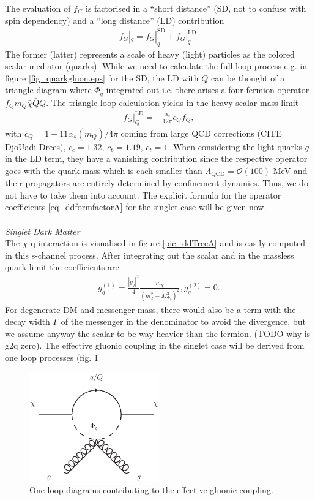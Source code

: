 \noindent The evaluation of $f_G$ is factorised in a ``short distance'' (SD, not to confuse with spin dependency) and a ``long distance'' (LD) 
contribution
\begin{align}
 f_G|_q = f_G|^\text{SD}_q + f_G|^\text{LD}_q. 
\end{align}
The former (latter) represents a scale of heavy (light) particles as the colored scalar mediator (quarks). While we need to calculate the full
loop process e.g. in figure \ref{fig_quarkgluon.eps} for the SD, the LD with $Q$ can be thought of a triangle diagram where $\Phi_q$ integrated 
out i.e. there arises a four fermion operator $f_Q m_Q \bar \chi \bar Q Q$. The triangle loop calculation yields in the heavy scalar mass limit 
\begin{align}
 f_G|_Q^\text{LD} = -\frac{\alpha_s}{12\pi} c_Q f_Q,
\end{align}
with $c_Q = 1+11\alpha_s(m_Q)/4\pi$ coming from large QCD corrections (CITE DjoUadi Drees), $c_c=1.32$, $c_b = 1.19$, $c_t = 1$.
When considering the light quarks $q$ in the LD term, they have a vanishing contribution since the respective operator goes with the quark mass
which is each smaller than $\Lambda_\text{QCD} = \mathcal{O}(100)$ MeV and their propagators are entirely determined by confinement dynamics. Thus,
we do not have to take them into account. The explicit formula for the operator coefficients \eqref{eq_ddformfactorA} for the singlet case 
will be given now.
\\ \\ \textit{Singlet Dark Matter}\\
The $\chi$-q interaction is visualised in figure \ref{pic_ddTreeA} and is easily computed in this s-channel process. After integrating out the 
scalar and in the massless quark limit the coefficients are
\begin{align}
 g_q^{(1)} = \frac{|g_q|^2 }{4} \frac{m_\chi}{\left(m_\chi^2 - M_{\Phi_q}^2\right)^2},
 g_q^{(2)} = 0.
\end{align}
For degenerate DM and messenger mass, there would also be a term with the decay width $\Gamma$ of the messenger in the denominator to avoid the 
divergence, but we assume anyway the scalar to be way heavier than the fermion. (TODO why is g2q zero). The effective gluonic coupling in the 
singlet case will be derived from one loop processes (fig. \ref{pic_ddGluonA} 
\begin{figure}[t]
 \includegraphics[width=0.5\textwidth]{../pics/phigluon.eps}
 \caption{One loop diagrams contributing to the effective gluonic coupling.}
 \label{pic_ddGluonA}
\end{figure}
